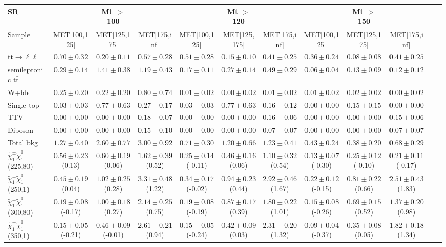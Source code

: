 \begin{table}
\begin{center}
\small
\begin{tabular}{lccccccccccc}
\hline
SR & & Mt $>$ 100 & & & Mt $>$ 120 & & &Mt $>$ 150 & & &\\
\hline
Sample&MET[100,125]&MET[125,175]&MET[175,inf]&MET[100,125]&MET[125,175]&MET[175,inf]&MET[100,125]&MET[125,175]&MET[175,inf]&\\
\hline
$\mathrm{t}\bar{\mathrm{t}}\rightarrow \ell\ell$&$0.70\pm0.32$&$0.20\pm0.11$&$0.57\pm0.28$&$0.51\pm0.28$&$0.15\pm0.10$&$0.41\pm0.25$&$0.36\pm0.24$&$0.08\pm0.08$&$0.41\pm0.25$\\
semileptonic $\mathrm{t}\bar{\mathrm{t}}$&$0.29\pm0.14$&$1.41\pm0.38$&$1.19\pm0.43$&$0.17\pm0.11$&$0.27\pm0.14$&$0.49\pm0.29$&$0.06\pm0.04$&$0.13\pm0.09$&$0.12\pm0.12$\\
W+bb&$0.25\pm0.20$&$0.22\pm0.20$&$0.80\pm0.74$&$0.01\pm0.02$&$0.00\pm0.02$&$0.01\pm0.02$&$0.01\pm0.02$&$0.02\pm0.02$&$0.00\pm0.02$\\
Single top&$0.03\pm0.03$&$0.77\pm0.63$&$0.27\pm0.17$&$0.03\pm0.03$&$0.77\pm0.63$&$0.16\pm0.12$&$0.00\pm0.00$&$0.15\pm0.15$&$0.00\pm0.00$\\
TTV&$0.00\pm0.00$&$0.00\pm0.00$&$0.18\pm0.07$&$0.00\pm0.00$&$0.00\pm0.00$&$0.16\pm0.06$&$0.00\pm0.00$&$0.00\pm0.00$&$0.15\pm0.06$\\
Diboson&$0.00\pm0.00$&$0.00\pm0.00$&$0.15\pm0.10$&$0.00\pm0.00$&$0.00\pm0.00$&$0.07\pm0.07$&$0.00\pm0.00$&$0.00\pm0.00$&$0.07\pm0.07$\\
\hline
Total bkg&$1.27\pm0.40$&$2.60\pm0.77$&$3.00\pm0.92$&$0.71\pm0.30$&$1.20\pm0.66$&$1.23\pm0.41$&$0.43\pm0.24$&$0.38\pm0.20$&$0.68\pm0.29$\\
$\tilde{\chi}_{1}^{\pm}\tilde{\chi}_{1}^{0}$ (225,80)&$0.56\pm0.23$(0.13)&$0.60\pm0.19$(0.06)&$1.62\pm0.39$(0.52)&$0.25\pm0.14$(-0.11)&$0.46\pm0.16$(0.06)&$1.10\pm0.32$(0.54)&$0.13\pm0.07$(-0.30)&$0.25\pm0.12$(-0.10)&$0.21\pm0.11$(-0.17)\\
$\tilde{\chi}_{1}^{\pm}\tilde{\chi}_{1}^{0}$ (250,1)&$0.45\pm0.19$(0.04)&$1.02\pm0.25$(0.28)&$3.31\pm0.48$(1.22)&$0.34\pm0.17$(-0.02)&$0.94\pm0.23$(0.44)&$2.92\pm0.46$(1.67)&$0.22\pm0.12$(-0.15)&$0.81\pm0.22$(0.66)&$2.51\pm0.43$(1.83)\\
$\tilde{\chi}_{1}^{\pm}\tilde{\chi}_{1}^{0}$ (300,80)&$0.19\pm0.08$(-0.17)&$1.00\pm0.18$(0.27)&$2.14\pm0.25$(0.75)&$0.19\pm0.08$(-0.19)&$0.87\pm0.17$(0.39)&$1.80\pm0.22$(1.01)&$0.15\pm0.08$(-0.26)&$0.69\pm0.15$(0.52)&$1.37\pm0.20$(0.98)\\
$\tilde{\chi}_{1}^{\pm}\tilde{\chi}_{1}^{0}$ (350,1)&$0.15\pm0.05$(-0.21)&$0.46\pm0.09$(-0.01)&$2.61\pm0.21$(0.94)&$0.15\pm0.05$(-0.24)&$0.42\pm0.09$(0.03)&$2.31\pm0.20$(1.32)&$0.09\pm0.04$(-0.37)&$0.35\pm0.08$(0.05)&$1.82\pm0.18$(1.34)\\
\hline
\hline\hline
\end{tabular}
\end{center}
\end{table}
